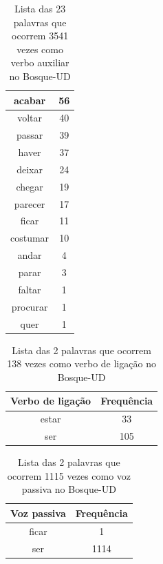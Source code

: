 \documentclass[output=paper,colorlinks,citecolor=brown]{langscibook}
\begin{document}
\begin{table}[]
{\begin{tabular}{|c|c|}
					acabar & 56\\\hline
					voltar & 40\\\hline
					passar & 39\\\hline
					haver & 37\\\hline
					deixar & 24\\\hline
					chegar & 19\\\hline
					parecer & 17\\\hline
					ficar & 11\\\hline
					costumar & 10\\\hline
					andar & 4\\\hline
					parar & 3\\\hline
					faltar & 1\\\hline
					procurar & 1\\\hline
					quer & 1\\\hline
			\end{tabular}
		}
		\caption{Lista das 23 palavras que ocorrem 3541 vezes como verbo auxiliar no Bosque-UD}
		\label{tab:aux}
	\end{table}

	\begin{table}[]
		\centering
		\begin{tabular}{|c|c|}
			\hline
			\textbf{Verbo de ligação} & \textbf{Frequência} \\\hline
			estar & 33\\\hline
			ser & 105\\\hline
		\end{tabular}
		\caption{Lista das 2 palavras que ocorrem 138 vezes como verbo de ligação no Bosque-UD}
		\label{tab:verbosdeligação}
	\end{table}

	\begin{table}[]
		\centering
		\begin{tabular}{|c|c|}
			\hline
			\textbf{Voz passiva} & \textbf{Frequência} \\\hline
			ficar & 1\\\hline
			ser & 1114\\\hline
		\end{tabular}
		\caption{Lista das 2 palavras que ocorrem 1115 vezes como voz passiva no Bosque-UD}
		\label{tab:vozpassiva}
	\end{table}
\end{document}

